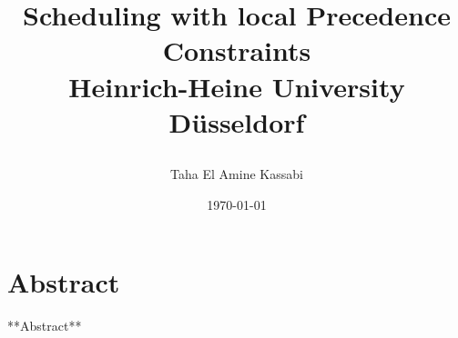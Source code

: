 \documentclass{report}
\title{
    \begin{figure}
        \centering
        
    \end{figure}

    Scheduling with local Precedence Constraints\\
    {\Large Heinrich-Heine University Düsseldorf}
}
\author{Taha El Amine Kassabi}
\date{\today}
\begin{document}
    

    \maketitle

    \chapter*{Abstract}
    **Abstract**

    \tableofcontents

    
    
    
    
    

    \appendix
    
    
\end{document}
